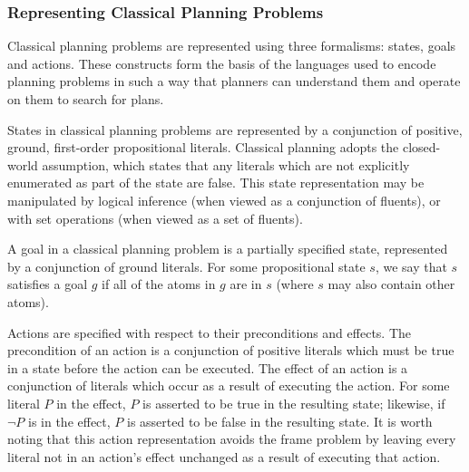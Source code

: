 \subsubsection{Representing Classical Planning Problems}

Classical planning problems are represented using three formalisms: states, goals and actions. These constructs form the basis of the languages used to encode planning problems in such a way that planners can understand them and operate on them to search for plans. 

States in classical planning problems are represented by a conjunction of positive, ground, first-order propositional literals. Classical planning adopts the closed-world assumption, which states that any literals which are not explicitly enumerated as part of the state are false. This state representation may be manipulated by logical inference (when viewed as a conjunction of fluents), or with set operations (when viewed as a set of fluents).

A goal in a classical planning problem is a partially specified state, represented by a conjunction of ground literals. For some propositional state $s$, we say that $s$ satisfies a goal $g$ if all of the atoms in $g$ are in $s$ (where $s$ may also contain other atoms).

Actions are specified with respect to their preconditions and effects. The precondition of an action is a conjunction of positive literals which must be true in a state before the action can be executed. The effect of an action is a conjunction of literals which occur as a result of executing the action. For some literal $P$ in the effect, $P$ is asserted to be true in the resulting state; likewise, if $\lnot P$ is in the effect, $P$ is asserted to be false in the resulting state. It is worth noting that this action representation avoids the frame problem by leaving every literal not in an action's effect unchanged as a result of executing that action. 

